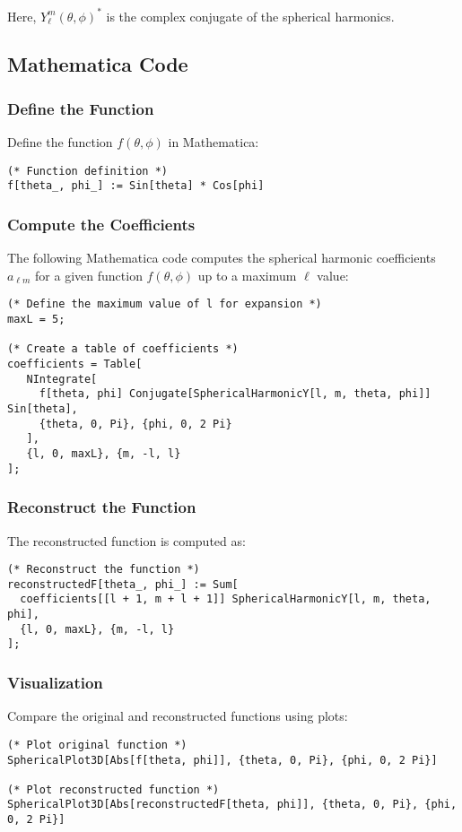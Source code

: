 Here, \( Y_\ell^m(\theta, \phi)^* \) is the complex conjugate of the spherical harmonics.

\subsection{Mathematica Code}

\subsubsection{Define the Function}
Define the function \( f(\theta, \phi) \) in Mathematica:
\begin{lstlisting}
(* Function definition *)
f[theta_, phi_] := Sin[theta] * Cos[phi]
\end{lstlisting}

\subsubsection{Compute the Coefficients}
The following Mathematica code computes the spherical harmonic coefficients \( a_{\ell m} \) for a given function \( f(\theta, \phi) \) up to a maximum \( \ell \) value:
\begin{lstlisting}
(* Define the maximum value of l for expansion *)
maxL = 5;

(* Create a table of coefficients *)
coefficients = Table[
   NIntegrate[
     f[theta, phi] Conjugate[SphericalHarmonicY[l, m, theta, phi]] Sin[theta],
     {theta, 0, Pi}, {phi, 0, 2 Pi}
   ],
   {l, 0, maxL}, {m, -l, l}
];
\end{lstlisting}

\subsubsection{Reconstruct the Function}
The reconstructed function is computed as:
\begin{lstlisting}
(* Reconstruct the function *)
reconstructedF[theta_, phi_] := Sum[
  coefficients[[l + 1, m + l + 1]] SphericalHarmonicY[l, m, theta, phi],
  {l, 0, maxL}, {m, -l, l}
];
\end{lstlisting}

\subsubsection{Visualization}
Compare the original and reconstructed functions using plots:
\begin{lstlisting}
(* Plot original function *)
SphericalPlot3D[Abs[f[theta, phi]], {theta, 0, Pi}, {phi, 0, 2 Pi}]

(* Plot reconstructed function *)
SphericalPlot3D[Abs[reconstructedF[theta, phi]], {theta, 0, Pi}, {phi, 0, 2 Pi}]
\end{lstlisting}

